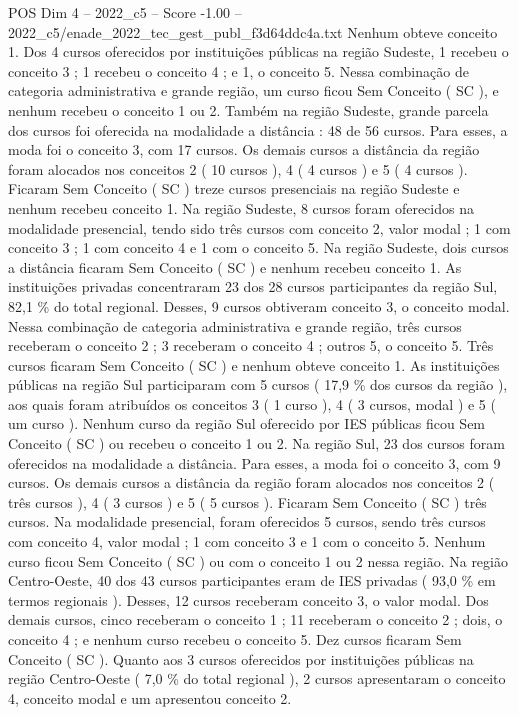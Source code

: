 \begin{textsample}{POS Dim 4 – 2022\_c5 – Score -1.00 – 2022\_c5/enade\_2022\_tec\_gest\_publ\_f3d64ddc4a.txt}
Nenhum obteve conceito 1.
Dos 4 cursos oferecidos por instituições públicas na região Sudeste, 1 recebeu o conceito 3 ; 1 recebeu o conceito 4 ; e 1, o conceito 5.
Nessa combinação de categoria administrativa e grande região, um curso ficou Sem Conceito ( SC ), e nenhum recebeu o conceito 1 ou 2.
Também na região Sudeste, grande parcela dos cursos foi oferecida na modalidade a distância : 48 de 56 cursos.
Para esses, a moda foi o conceito 3, com 17 cursos.
Os demais cursos a distância da região foram alocados nos conceitos 2 ( 10 cursos ), 4 ( 4 cursos ) e 5 ( 4 cursos ).
Ficaram Sem Conceito ( SC ) treze cursos presenciais na região Sudeste e nenhum recebeu conceito 1.
Na região Sudeste, 8 cursos foram oferecidos na modalidade presencial, tendo sido três cursos com conceito 2, valor modal ; 1 com conceito 3 ; 1 com conceito 4 e 1 com o conceito 5.
Na região Sudeste, dois cursos a distância ficaram Sem Conceito ( SC ) e nenhum recebeu conceito 1.
As instituições privadas concentraram 23 dos 28 cursos participantes da região Sul, 82,1 \% do total regional.
Desses, 9 cursos obtiveram conceito 3, o conceito modal.
Nessa combinação de categoria administrativa e grande região, três cursos receberam o conceito 2 ; 3 receberam o conceito 4 ; outros 5, o conceito 5.
Três cursos ficaram Sem Conceito ( SC ) e nenhum obteve conceito 1.
As instituições públicas na região Sul participaram com 5 cursos ( 17,9 \% dos cursos da região ), aos quais foram atribuídos os conceitos 3 ( 1 curso ), 4 ( 3 cursos, modal ) e 5 ( um curso ).
Nenhum curso da região Sul oferecido por IES públicas ficou Sem Conceito ( SC ) ou recebeu o conceito 1 ou 2.
Na região Sul, 23 dos cursos foram oferecidos na modalidade a distância.
Para esses, a moda foi o conceito 3, com 9 cursos.
Os demais cursos a distância da região foram alocados nos conceitos 2 ( três cursos ), 4 ( 3 cursos ) e 5 ( 5 cursos ).
Ficaram Sem Conceito ( SC ) três cursos.
Na modalidade presencial, foram oferecidos 5 cursos, sendo três cursos com conceito 4, valor modal ; 1 com conceito 3 e 1 com o conceito 5.
Nenhum curso ficou Sem Conceito ( SC ) ou com o conceito 1 ou 2 nessa região.
Na região Centro-Oeste, 40 dos 43 cursos participantes eram de IES privadas ( 93,0 \% em termos regionais ).
Desses, 12 cursos receberam conceito 3, o valor modal.
Dos demais cursos, cinco receberam o conceito 1 ; 11 receberam o conceito 2 ; dois, o conceito 4 ; e nenhum curso recebeu o conceito 5.
Dez cursos ficaram Sem Conceito ( SC ).
Quanto aos 3 cursos oferecidos por instituições públicas na região Centro-Oeste ( 7,0 \% do total regional ), 2 cursos apresentaram o conceito 4, conceito modal e um apresentou conceito 2.

\end{textsample}
